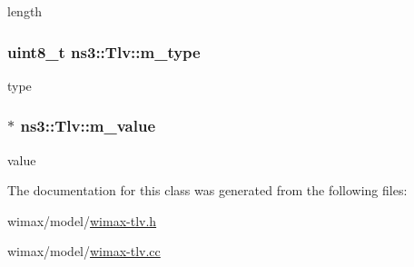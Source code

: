 length 

\subsubsection[{\texorpdfstring{m\+\_\+type}{m_type}}]{\setlength{\rightskip}{0pt plus 5cm}uint8\+\_\+t ns3\+::\+Tlv\+::m\+\_\+type\hspace{0.3cm}{\ttfamily [private]}}\hypertarget{classns3_1_1Tlv_a16281bcabeafd34ba3a0f70823295ff2}{}\label{classns3_1_1Tlv_a16281bcabeafd34ba3a0f70823295ff2}


type 

\subsubsection[{\texorpdfstring{m\+\_\+value}{m_value}}]{$\ast$ ns3\+::\+Tlv\+::m\+\_\+value\hspace{0.3cm}{\ttfamily [private]}}\hypertarget{classns3_1_1Tlv_add00ad86b735ae058202b756bdc1d15c}{}\label{classns3_1_1Tlv_add00ad86b735ae058202b756bdc1d15c}


value 



The documentation for this class was generated from the following files\+:\begin{DoxyCompactItemize}
\item 
wimax/model/\hyperlink{wimax-tlv_8h}{wimax-\/tlv.\+h}\item 
wimax/model/\hyperlink{wimax-tlv_8cc}{wimax-\/tlv.\+cc}\end{DoxyCompactItemize}
